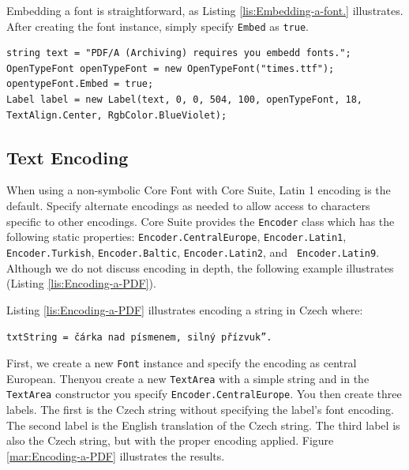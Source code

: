 \documentclass[american]{tufte-book}
\numberwithin{equation}{section}
\numberwithin{figure}{section}
\begin{document}
{Embedding a font is straightforward, as Listing \ref{lis:Embedding-a-font.}
illustrates. After creating the font instance, simply specify \texttt{Embed}
as \texttt{true}. 

\bgroup{}
\begin{lstlisting}[caption={Embedding a font.},label={lis:Embedding-a-font.},basicstyle={\footnotesize\ttfamily},breaklines=true]
string text = "PDF/A (Archiving) requires you embedd fonts.";
OpenTypeFont openTypeFont = new OpenTypeFont("times.ttf");
opentypeFont.Embed = true;
Label label = new Label(text, 0, 0, 504, 100, openTypeFont, 18, TextAlign.Center, RgbColor.BlueViolet);
\end{lstlisting}
\leavevmode\egroup


\subsection{Text Encoding}

When using a non-symbolic Core Font with Core Suite, Latin 1 encoding
is the default. Specify alternate encodings as needed to allow access
to characters specific to other encodings. Core Suite provides the
\texttt{Encoder} class which has the following static properties:
\texttt{Encoder.CentralEurope}, \texttt{Encoder.Latin1},
\texttt{Encoder.Turkish}, \texttt{Encoder.Baltic},
\texttt{Encoder.Latin2}, and  \texttt{ Encoder.Latin9}.
Although we do not discuss encoding in depth, the following example
illustrates (Listing \ref{lis:Encoding-a-PDF}).

Listing \ref{lis:Encoding-a-PDF} illustrates encoding a string in
Czech where:
\noindent\begin{flushleft}
\texttt{txtString = \textquotedbl čárka nad písmenem, silný
přízvuk''.} 
\par\end{flushleft}

First, we create a new \texttt{Font} instance and specify
the encoding as central European. Thenyou create a new \texttt{TextArea}
with a simple string and in the \texttt{TextArea} constructor
you specify \texttt{Encoder.CentralEurope}. You then create
three labels. The first is the Czech string without specifying the
label's font encoding. The second label is the English translation
of the Czech string. The third label is also the Czech string, but
with the proper encoding applied. Figure \ref{mar:Encoding-a-PDF}
illustrates the results. 

}
\end{document}
